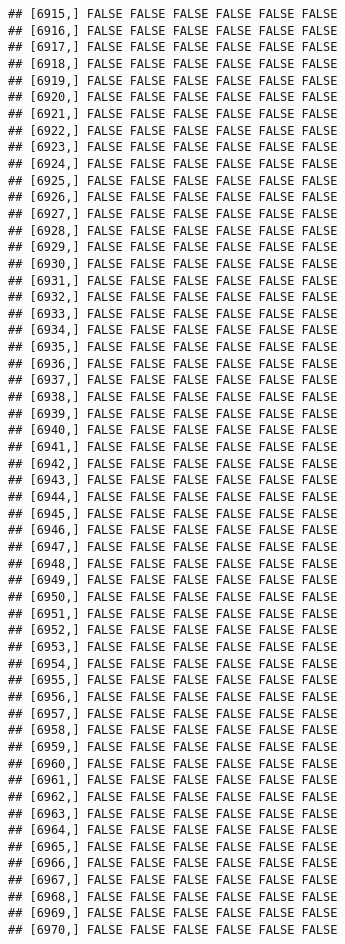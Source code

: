 \documentclass[
]{article}
\begin{document}
\begin{verbatim}
## [6915,] FALSE FALSE FALSE FALSE FALSE FALSE
## [6916,] FALSE FALSE FALSE FALSE FALSE FALSE
## [6917,] FALSE FALSE FALSE FALSE FALSE FALSE
## [6918,] FALSE FALSE FALSE FALSE FALSE FALSE
## [6919,] FALSE FALSE FALSE FALSE FALSE FALSE
## [6920,] FALSE FALSE FALSE FALSE FALSE FALSE
## [6921,] FALSE FALSE FALSE FALSE FALSE FALSE
## [6922,] FALSE FALSE FALSE FALSE FALSE FALSE
## [6923,] FALSE FALSE FALSE FALSE FALSE FALSE
## [6924,] FALSE FALSE FALSE FALSE FALSE FALSE
## [6925,] FALSE FALSE FALSE FALSE FALSE FALSE
## [6926,] FALSE FALSE FALSE FALSE FALSE FALSE
## [6927,] FALSE FALSE FALSE FALSE FALSE FALSE
## [6928,] FALSE FALSE FALSE FALSE FALSE FALSE
## [6929,] FALSE FALSE FALSE FALSE FALSE FALSE
## [6930,] FALSE FALSE FALSE FALSE FALSE FALSE
## [6931,] FALSE FALSE FALSE FALSE FALSE FALSE
## [6932,] FALSE FALSE FALSE FALSE FALSE FALSE
## [6933,] FALSE FALSE FALSE FALSE FALSE FALSE
## [6934,] FALSE FALSE FALSE FALSE FALSE FALSE
## [6935,] FALSE FALSE FALSE FALSE FALSE FALSE
## [6936,] FALSE FALSE FALSE FALSE FALSE FALSE
## [6937,] FALSE FALSE FALSE FALSE FALSE FALSE
## [6938,] FALSE FALSE FALSE FALSE FALSE FALSE
## [6939,] FALSE FALSE FALSE FALSE FALSE FALSE
## [6940,] FALSE FALSE FALSE FALSE FALSE FALSE
## [6941,] FALSE FALSE FALSE FALSE FALSE FALSE
## [6942,] FALSE FALSE FALSE FALSE FALSE FALSE
## [6943,] FALSE FALSE FALSE FALSE FALSE FALSE
## [6944,] FALSE FALSE FALSE FALSE FALSE FALSE
## [6945,] FALSE FALSE FALSE FALSE FALSE FALSE
## [6946,] FALSE FALSE FALSE FALSE FALSE FALSE
## [6947,] FALSE FALSE FALSE FALSE FALSE FALSE
## [6948,] FALSE FALSE FALSE FALSE FALSE FALSE
## [6949,] FALSE FALSE FALSE FALSE FALSE FALSE
## [6950,] FALSE FALSE FALSE FALSE FALSE FALSE
## [6951,] FALSE FALSE FALSE FALSE FALSE FALSE
## [6952,] FALSE FALSE FALSE FALSE FALSE FALSE
## [6953,] FALSE FALSE FALSE FALSE FALSE FALSE
## [6954,] FALSE FALSE FALSE FALSE FALSE FALSE
## [6955,] FALSE FALSE FALSE FALSE FALSE FALSE
## [6956,] FALSE FALSE FALSE FALSE FALSE FALSE
## [6957,] FALSE FALSE FALSE FALSE FALSE FALSE
## [6958,] FALSE FALSE FALSE FALSE FALSE FALSE
## [6959,] FALSE FALSE FALSE FALSE FALSE FALSE
## [6960,] FALSE FALSE FALSE FALSE FALSE FALSE
## [6961,] FALSE FALSE FALSE FALSE FALSE FALSE
## [6962,] FALSE FALSE FALSE FALSE FALSE FALSE
## [6963,] FALSE FALSE FALSE FALSE FALSE FALSE
## [6964,] FALSE FALSE FALSE FALSE FALSE FALSE
## [6965,] FALSE FALSE FALSE FALSE FALSE FALSE
## [6966,] FALSE FALSE FALSE FALSE FALSE FALSE
## [6967,] FALSE FALSE FALSE FALSE FALSE FALSE
## [6968,] FALSE FALSE FALSE FALSE FALSE FALSE
## [6969,] FALSE FALSE FALSE FALSE FALSE FALSE
## [6970,] FALSE FALSE FALSE FALSE FALSE FALSE

\end{verbatim}
\end{document}
